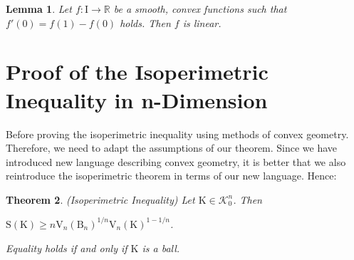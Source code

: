 \documentclass[a4paper]{book}
\newtheorem{theorem}{Theorem}%
\newtheorem{lemma}[theorem]{Lemma}%
\numberwithin{theorem}{section}%
\begin{document}
\begin{lemma}
    Let $f:\mathrm{I}\to\mathbb{R}$ be a smooth, convex functions such that $f'(0)=f(1)-f(0)$ holds. Then $f$ is linear.
\end{lemma}

\section{Proof of the Isoperimetric Inequality in n-Dimension}
Before proving the isoperimetric inequality using methods of convex geometry. Therefore, we need to adapt the assumptions of our theorem. Since we have introduced new language describing convex geometry, it is better that we also reintroduce the isoperimetric theorem in terms of our new language. Hence:
\begin{theorem} (Isoperimetric Inequality)
    Let $\mathrm{K}\in\mathscr{K}_{0}^{n}$. Then
    \begin{center}
        $\displaystyle \mathrm{S}(\mathrm{K})\geq n\mathrm{V}_{n}(\mathrm{B}_{n})^{1/n}\mathrm{V}_{n}(\mathrm{K})^{1-1/n}$.
    \end{center}
    Equality holds if and only if $\mathrm{K}$ is a ball.
\end{theorem}
\end{document}
